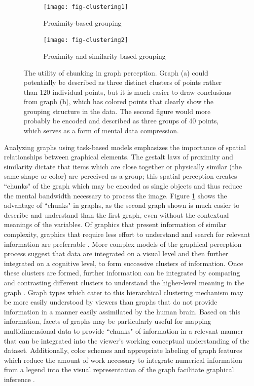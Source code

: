 \documentclass[11pt]{isuthesis}\usepackage[]{graphicx}\usepackage[]{color}
\begin{document}
\begin{figure}[htbp]\centering
\begin{subfigure}[b]{.45\linewidth}\centering
  \texttt{[image: fig-clustering1]}
  \caption{Proximity-based grouping}
\end{subfigure}\hfill
\begin{subfigure}[b]{.45\linewidth}\centering
  \texttt{[image: fig-clustering2]}
  \caption{Proximity and similarity-based grouping}
\end{subfigure}\hfill
\caption[Chunking in graphs]{The utility of chunking in graph perception. Graph (a) could potentially be described as three distinct clusters of points rather than 120 individual points, but it is much easier to draw conclusions from graph (b), which has colored points that clearly show the grouping structure in the data. The second figure would more probably be encoded and described as three groups of 40 points, which serves as a form of mental data compression.}\label{fig:clustering}
\end{figure}

Analyzing graphs using task-based models emphasizes the importance of spatial relationships between graphical elements. The gestalt laws of proximity and similarity dictate that items which are close together or physically similar (the same shape or color) are perceived as a group; this spatial perception creates ``chunks" of the graph which may be encoded as single objects and thus reduce the mental bandwidth necessary to process the image. Figure \ref{fig:clustering} shows the advantage of ``chunks" in graphs, as the second graph shown is much easier to describe and understand than the first graph, even without the contextual meanings of the variables. Of graphics that present information of similar complexity, graphics that require less effort to understand and search for relevant information are preferrable \citep{cleveland:1985}. More complex models of the graphical perception process suggest that data are integrated on a visual level and then further integrated on a cognitive level, to form successive clusters of information. Once these clusters are formed, further information can be integrated by comparing and contrasting different clusters to understand the higher-level meaning in the graph \citep{ratwani2008thinking}. Graph types which cater to this hierarchical clustering mechanism may be more easily understood by viewers than graphs that do not provide information in a manner easily assimilated by the human brain. Based on this information, facets of graphs may be particularly useful for mapping multidimensional data to provide ``chunks" of information in a relevant manner that can be integrated into the viewer's working conceptual understanding of the dataset. Additionally, color schemes and appropriate labeling of graph features which reduce the amount of work necessary to integrate numerical information from a legend into the visual representation of the graph facilitate graphical inference \citep{carpenter1998model}.
\end{document}
